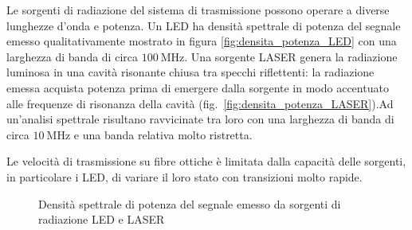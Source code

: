 Le sorgenti di radiazione del sistema di trasmissione possono operare a diverse lunghezze d'onda e potenza. Un \ac{LED} ha densità spettrale di potenza del segnale emesso qualitativamente mostrato in figura \ref{fig:densita_potenza_LED} con una larghezza di banda di circa $\SI{100}{\mega\hertz}$.
Una sorgente \ac{LASER} genera la radiazione luminosa in una cavità risonante chiusa tra specchi riflettenti: la radiazione emessa acquista potenza prima di emergere dalla sorgente in modo accentuato alle frequenze di risonanza della cavità (fig.~\ref{fig:densita_potenza_LASER}).Ad un'analisi spettrale risultano ravvicinate tra loro con una larghezza di banda di circa $\SI{10}{\mega\hertz}$ e una banda relativa molto ristretta.

Le velocità di trasmissione su fibre ottiche è limitata dalla capacità delle sorgenti, in particolare i \ac{LED}, di variare il loro stato con transizioni molto rapide.
\begin{figure}[!ht]\centering
	\quad{}
	\caption{Densità spettrale di potenza del segnale emesso da sorgenti di radiazione \ac{LED} e \ac{LASER}}
\end{figure}


